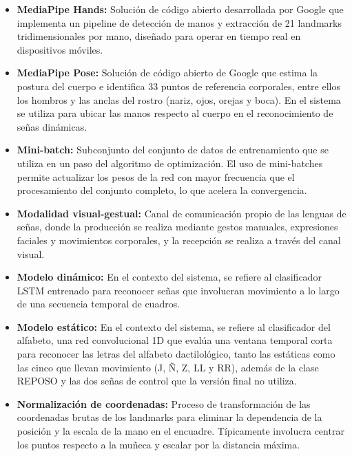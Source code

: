 \begin{itemize}
    \item[] \textbf{MediaPipe Hands:} Solución de código abierto desarrollada por Google que implementa un pipeline de detección de manos y extracción de 21 landmarks tridimensionales por mano, diseñado para operar en tiempo real en dispositivos móviles.\\

    \item[] \textbf{MediaPipe Pose:} Solución de código abierto de Google que estima la postura del cuerpo e identifica 33 puntos de referencia corporales, entre ellos los hombros y las anclas del rostro (nariz, ojos, orejas y boca). En el sistema se utiliza para ubicar las manos respecto al cuerpo en el reconocimiento de señas dinámicas.\\

    \item[] \textbf{Mini-batch:} Subconjunto del conjunto de datos de entrenamiento que se utiliza en un paso del algoritmo de optimización. El uso de mini-batches permite actualizar los pesos de la red con mayor frecuencia que el procesamiento del conjunto completo, lo que acelera la convergencia.\\

    \item[] \textbf{Modalidad visual-gestual:} Canal de comunicación propio de las lenguas de señas, donde la producción se realiza mediante gestos manuales, expresiones faciales y movimientos corporales, y la recepción se realiza a través del canal visual.\\

    \item[] \textbf{Modelo dinámico:} En el contexto del sistema, se refiere al clasificador LSTM entrenado para reconocer señas que involucran movimiento a lo largo de una secuencia temporal de cuadros.\\

    \item[] \textbf{Modelo estático:} En el contexto del sistema, se refiere al clasificador del alfabeto, una red convolucional 1D que evalúa una ventana temporal corta para reconocer las letras del alfabeto dactilológico, tanto las estáticas como las cinco que llevan movimiento (J, Ñ, Z, LL y RR), además de la clase REPOSO y las dos señas de control que la versión final no utiliza.\\

    \item[] \textbf{Normalización de coordenadas:} Proceso de transformación de las coordenadas brutas de los landmarks para eliminar la dependencia de la posición y la escala de la mano en el encuadre. Típicamente involucra centrar los puntos respecto a la muñeca y escalar por la distancia máxima.\\


\end{itemize}
